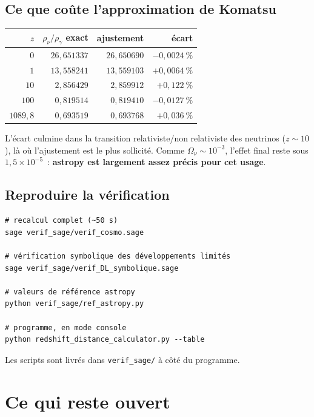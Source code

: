 \documentclass[11pt,a4paper]{report}
\begin{document}
\section{Ce que coûte l'approximation de Komatsu}

\begin{center}
\renewcommand{\arraystretch}{1.2}
\begin{tabular}{rrrr}
\toprule
$z$ & $\rho_{\nu}/\rho_{\gamma}$ exact & ajustement & écart \\
\midrule
$0$        & $26{,}651337$ & $26{,}650690$ & $-0{,}0024~\%$ \\
$1$        & $13{,}558241$ & $13{,}559103$ & $+0{,}0064~\%$ \\
$10$       & $2{,}856429$  & $2{,}859912$  & $+0{,}122~\%$ \\
$100$      & $0{,}819514$  & $0{,}819410$  & $-0{,}0127~\%$ \\
$1089{,}8$ & $0{,}693519$  & $0{,}693768$  & $+0{,}036~\%$ \\
\bottomrule
\end{tabular}
\end{center}

\noindent L'écart culmine dans la transition relativiste/non relativiste des
neutrinos ($z\sim10$), là où l'ajustement est le plus sollicité. Comme
$\Omega_{\nu}\sim10^{-3}$, l'effet final reste sous $1{,}5\times10^{-5}$~:
\textbf{astropy est largement assez précis pour cet usage}.

\section{Reproduire la vérification}

\begin{verbatim}
# recalcul complet (~50 s)
sage verif_sage/verif_cosmo.sage

# vérification symbolique des développements limités
sage verif_sage/verif_DL_symbolique.sage

# valeurs de référence astropy
python verif_sage/ref_astropy.py

# programme, en mode console
python redshift_distance_calculator.py --table
\end{verbatim}

\noindent Les scripts sont livrés dans \texttt{verif\_sage/} à côté du
programme.

\chapter{Ce qui reste ouvert}
\end{document}
